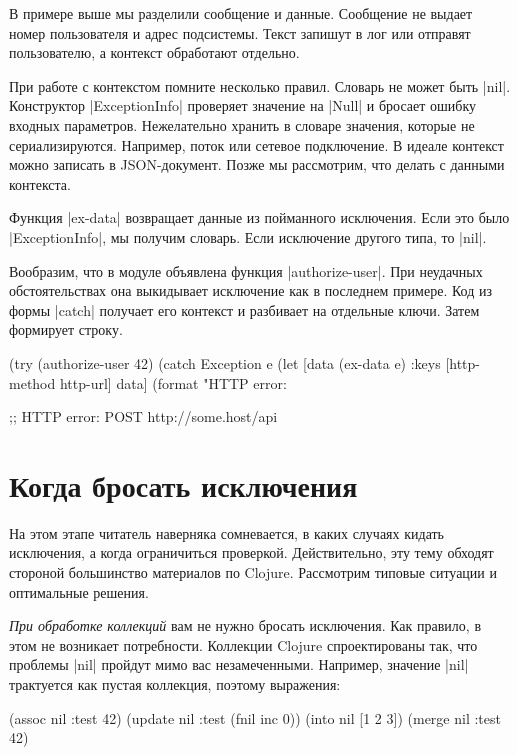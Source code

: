 В примере выше мы разделили сообщение и данные. Сообщение не выдает номер
пользователя и адрес подсистемы. Текст запишут в лог или отправят пользователю,
а контекст обработают отдельно.

При работе с контекстом помните несколько правил. Словарь не может быть
\spverb|nil|. Конструктор \spverb|ExceptionInfo| проверяет значение на \spverb|Null| и бросает ошибку
входных параметров. Нежелательно хранить в словаре значения, которые не
сериализируются. Например, поток или сетевое подключение. В идеале контекст
можно записать в JSON-документ. Позже мы рассмотрим, что делать с данными
контекста.

Функция \spverb|ex-data| возвращает данные из пойманного исключения. Если это было
\spverb|ExceptionInfo|, мы получим словарь. Если исключение другого типа, то \spverb|nil|.

Вообразим, что в модуле объявлена функция \spverb|authorize-user|. При неудачных
обстоятельствах она выкидывает исключение как в последнем примере. Код из формы
\spverb|catch| получает его контекст и разбивает на отдельные ключи. Затем формирует
строку.

\begin{code}
(try
  (authorize-user 42)
  (catch Exception e
    (let [data (ex-data e)
          {:keys [http-method http-url]} data]
      (format "HTTP error: %

;; HTTP error: POST http://some.host/api
\end{code}

\section{Когда бросать исключения}

На этом этапе читатель наверняка сомневается, в каких случаях кидать исключения,
а когда ограничиться проверкой. Действительно, эту тему обходят стороной
большинство материалов по Clojure. Рассмотрим типовые ситуации и оптимальные
решения.

\emph{При обработке коллекций} вам не нужно бросать исключения. Как правило, в этом
не возникает потребности. Коллекции Clojure спроектированы так, что проблемы
\spverb|nil| пройдут мимо вас незамеченными. Например, значение \spverb|nil| трактуется как
пустая коллекция, поэтому выражения:

\begin{code}
(assoc nil :test 42)
(update nil :test (fnil inc 0))
(into nil [1 2 3])
(merge nil {:test 42})
\end{code}

